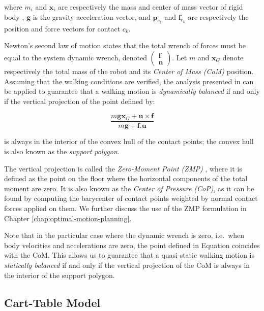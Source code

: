 \noindent where $m_i$ and $\mathbf{x}_i$ are respectively the mass and
center of mass vector of rigid body , $\mathbf{g}$ is the
gravity acceleration vector, and $\mathbf{p}_{c_k}$ and
$\mathbf{f}_{c_k}$ are respectively the position and force vectors for
contact $c_k$.

Newton's second law of motion states that the total wrench of forces
must be equal to the system dynamic wrench, denoted
$\left(\begin{matrix}\mathbf{f}\\\mathbf{n}\end{matrix}\right)$. Let
$m$ and $\mathbf{x}_G$ denote respectively the total mass of the robot
and its \emph{Center of Mass (CoM)} position. Assuming that the
walking conditions are verified, the analysis presented in
\cite{wieber2002} can be applied to guarantee that a walking motion is
\emph{dynamically balanced} if and only if the vertical projection of
the point defined by:

\begin{equation}
\label{eq:chap1-dynamic-balance}
  \frac{m\mathbf{g}\mathbf{x}_G +
    \mathbf{u}\times\mathbf{f}}{m\mathbf{g} + \mathbf{f}.\mathbf{u}}
\end{equation}

\noindent is always in the interior of the convex hull of the contact points;
the convex hull is also known as the \emph{support polygon}.

The vertical projection is called the \emph{Zero-Moment Point (ZMP)}
\cite{vukobratovic1969contribution}, where it is defined as the point
on the floor where the horizontal components of the total moment are
zero. It is also known as the \emph{Center of Pressure (CoP)}, as it
can be found by computing the barycenter of contact points weighted by
normal contact forces applied on them. We further discuss the use of
the ZMP formulation in Chapter \ref{chap:optimal-motion-planning}.

Note that in the particular case where the dynamic wrench is zero,
i.e.\ when body velocities and accelerations are zero, the point
defined in Equation  coincides with
the CoM. This allows us to guarantee that a quasi-static walking
motion is \emph{statically balanced} if and only if the vertical
projection of the CoM is always in the interior of the support
polygon.

\subsection{Cart-Table Model}
\label{subsec:chap1-cart-table}

